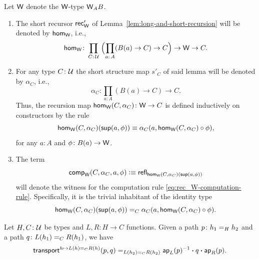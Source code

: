 \begin{ntn}\label{ntn:hom-alpha-comp} Let\/ $\mathsf{W}$ denote the\/ $\mathsf{W}$-type\/ $\mathsf{W}_AB$. 
    \begin{enumerate}[-]
        \item The short recursor\/ $\mathsf{rec}'_{\mathsf{W}}$ of\/ {\upshape Lemma~\ref{lem:long-and-short-recursion}} will be denoted by\/ $\mathsf{hom}_{\mathsf{W}}$, i.e.,
        \[
            \fun{hom}_{\fun W}\colon
                \prod_{C\colon\univ}\;
                \Bigl(
                    \prod_{a\colon A}(B(a)\to C)\to C
                \Bigr)
                \to\fun W\to C.
        \]
        
        \item For any type\/ $C\colon\univ$ the short structure map\/ $s'_C$ of said lemma will be denoted by\/ $\alpha_C$, i.e.,
        \[
            \alpha_C\colon\prod_{a\colon A}(B(a)\to C)\to C.
        \]
        Thus, the recursion map\/ $\fun{hom}_{\fun W}(C,\alpha_C)\colon\fun W\to C$ is defined inductively on constructors by the rule
        \[
            \mathsf{hom}_{\mathsf{W}}(C,\alpha_C)(\mathsf{sup}(a,\phi))
            \equiv
            \alpha_C(a,\mathsf{hom}_{\mathsf{W}}(C,\alpha_C)\circ\phi),
        \]
        for any\/ $a\colon A$ and\/ $\phi\colon B(a)\to\fun W$.

        \item The term
            \[
                \mathsf{comp}_{\mathsf{W}}(C,\alpha_C,a,\phi)
                \mathrel{\vcentcolon}\equiv\mathsf{refl}_{\mathsf{hom}_{\mathsf{W}}(C,\alpha_C)(\mathsf{sup}(a,\phi))}
            \]
            will denote the witness for the computation rule \eqref{eq:rec_W-computation-rule}. Specifically, it is the trivial inhabitant of the identity type
            \begin{equation}\label{eq:recursor-commutativity}
                \mathsf{hom}_{\mathsf{W}}(C,\alpha_C)(\mathsf{sup}(a,\phi))
                \mathrel{=_{C}}
                \alpha_C(a,\mathsf{hom}_{\mathsf{W}}(C,\alpha_C)\circ\phi).
        \end{equation}
    \end{enumerate}
\end{ntn}

\begin{lem}\label{lem:transport-identity-family}
    Let\/ $H, C\colon\univ$ be types and\/ $L,R\colon H\to C$ functions. Given a path\/ $p\colon h_1\eq Hh_2$ and a path\/ $q\colon L(h_1)\eq CR(h_1)$, we have
    \[
        \mathsf{transport}^{h\mapsto L(h)\mathrel{=_{C}}R(h)}(p,q) 
        \mathrel{=_{L(h_2)\mathrel{=_{C}}R(h_2)}}
        \mathsf{ap}_L(p)^{-1}\mathbin{\boldsymbol{\cdot}} q\mathbin{\boldsymbol{\cdot}}\mathsf{ap}_R(p).
    \]
\end{lem}

